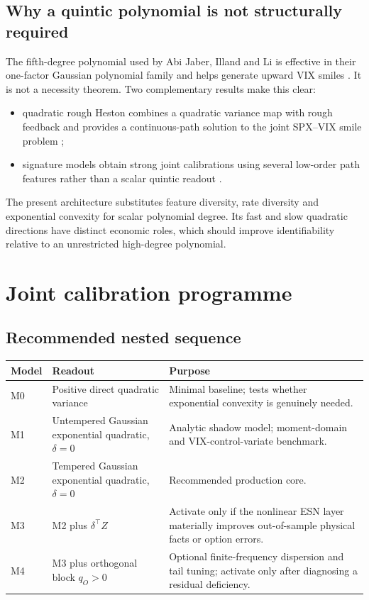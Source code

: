 \documentclass[11pt,a4paper]{article}
\begin{document}
\subsection{Why a quintic polynomial is not structurally required}

The fifth-degree polynomial used by Abi Jaber, Illand and Li is effective in their
one-factor Gaussian polynomial family and helps generate upward VIX smiles
\cite{abijaber2024}. It is not a necessity theorem. Two complementary results make this clear:

\begin{itemize}
  \item quadratic rough Heston combines a quadratic variance map with rough feedback and
  provides a continuous-path solution to the joint SPX--VIX smile problem
  \cite{gatheral2020};
  \item signature models obtain strong joint calibrations using several low-order path
  features rather than a scalar quintic readout \cite{cuchiero2024}.
\end{itemize}

The present architecture substitutes feature diversity, rate diversity and exponential
convexity for scalar polynomial degree. Its fast and slow quadratic directions have distinct
economic roles, which should improve identifiability relative to an unrestricted high-degree
polynomial.

\section{Joint calibration programme}

\subsection{Recommended nested sequence}

\begin{center}
\begin{tabularx}{\textwidth}{@{}C{13mm}L{40mm}Y@{}}
\toprule
\textbf{Model} & \textbf{Readout} & \textbf{Purpose} \\
\midrule
M0 & Positive direct quadratic variance & Minimal baseline; tests whether exponential
convexity is genuinely needed. \\
M1 & Untempered Gaussian exponential quadratic, \(\delta=0\) & Analytic shadow model;
moment-domain and VIX-control-variate benchmark. \\
M2 & Tempered Gaussian exponential quadratic, \(\delta=0\) & Recommended production core. \\
M3 & M2 plus \(\delta^\top Z\) & Activate only if the nonlinear ESN layer materially improves
out-of-sample physical facts or option errors. \\
M4 & M3 plus orthogonal block \(q_O>0\) & Optional finite-frequency dispersion and tail tuning;
activate only after diagnosing a residual deficiency. \\
\bottomrule
\end{tabularx}
\end{center}
\end{document}
